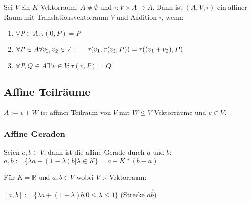 Sei $V$ ein $K$-Vektorraum, $A \neq \emptyset$ und $\tau : V \times A \rightarrow A$. Dann ist $(A, V, \tau)$ ein affiner Raum  mit Translationsvektorraum $V$ und Addition $\tau$, wenn:

\begin{enumerate}[label=(\alph*)]
	\item $\forall P \in A : \tau(0, P) = P$
	\item $\forall P \in A \forall v_1, v_2 \in V : \\ \hspace*{5mm} \tau(v_1, \tau(v_2, P)) = \tau((v_1 + v_2), P)$
	\item $\forall P, Q \in A \exists ! v \in V : \tau(v, P) = Q$
\end{enumerate}

\subsection*{Affine Teilräume}

$A := v + W$ ist affiner Teilraum von $V$ mit $W \leq V$ Vektorräume und $v \in V$.

\subsubsection*{Affine Geraden}

Seien $a, b \in V$, dann ist die affine Gerade durch $a$ und $b$: $\overline{a, b} := \{\lambda a + (1 - \lambda)b | \lambda \in K\} = a + K*(b-a)$

Für $K = \mathbb{R}$ und $a, b \in V$ wobei $V$ $\mathbb{R}$-Vektorraum:

$[a, b] := \{\lambda a + (1 - \lambda)b|0 \leq \lambda \leq 1\}$ (Strecke $\overrightarrow{ab}$)
